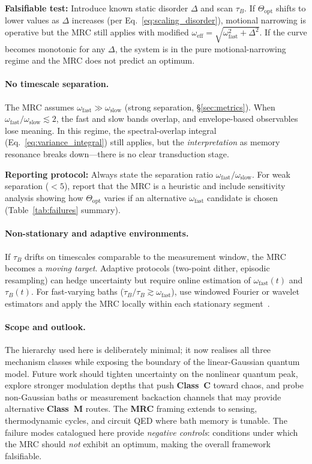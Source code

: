 \documentclass[11pt,letterpaper]{article}
\DeclareRobustCommand{\mrc}{\textbf{MRC}\xspace}
\DeclareRobustCommand{\classC}{\textbf{Class~C}\xspace}
\DeclareRobustCommand{\classM}{\textbf{Class~M}\xspace}
\begin{document}
\textbf{Falsifiable test:} Introduce known static disorder $\Delta$ and scan $\tau_B$. If $\Theta_{\text{opt}}$ shifts to lower values as $\Delta$ increases (per Eq.~\ref{eq:scaling_disorder}), motional narrowing is operative but the MRC still applies with modified $\omega_{\text{eff}}=\sqrt{\omega_{\mathrm{fast}}^2+\Delta^2}$. If the curve becomes monotonic for any $\Delta$, the system is in the pure motional-narrowing regime and the MRC does not predict an optimum.

\paragraph{No timescale separation.}
The MRC assumes $\omega_{\mathrm{fast}} \gg \omega_{\mathrm{slow}}$ (strong separation, §\ref{sec:metrics}). When $\omega_{\mathrm{fast}}/\omega_{\mathrm{slow}}\lesssim 2$, the fast and slow bands overlap, and envelope-based observables lose meaning. In this regime, the spectral-overlap integral (Eq.~\ref{eq:variance_integral}) still applies, but the \emph{interpretation} as memory resonance breaks down—there is no clear transduction stage.

\textbf{Reporting protocol:} Always state the separation ratio $\omega_{\mathrm{fast}}/\omega_{\mathrm{slow}}$. For weak separation ($<5$), report that the MRC is a heuristic and include sensitivity analysis showing how $\Theta_{\text{opt}}$ varies if an alternative $\omega_{\mathrm{fast}}$ candidate is chosen (Table~\ref{tab:failures} summary).

\paragraph{Non-stationary and adaptive environments.}
If $\tau_B$ drifts on timescales comparable to the measurement window, the MRC becomes a \emph{moving target}. Adaptive protocols (two-point dither, episodic resampling) can hedge uncertainty but require online estimation of $\omega_{\mathrm{fast}}(t)$ and $\tau_B(t)$. For fast-varying baths ($\dot\tau_B / \tau_B \gtrsim \omega_{\mathrm{fast}}$), use windowed Fourier or wavelet estimators and apply the MRC locally within each stationary segment~\cite{Priestley1981}.

\paragraph{Scope and outlook.}
The hierarchy used here is deliberately minimal; it now realises all three mechanism classes while exposing the boundary of the linear-Gaussian quantum model. Future work should tighten uncertainty on the nonlinear quantum peak, explore stronger modulation depths that push \classC{} toward chaos, and probe non-Gaussian baths or measurement backaction channels that may provide alternative \classM{} routes. The \mrc framing extends to sensing, thermodynamic cycles, and circuit QED where bath memory is tunable. The failure modes catalogued here provide \emph{negative controls}: conditions under which the MRC should \emph{not} exhibit an optimum, making the overall framework falsifiable.
\end{document}
